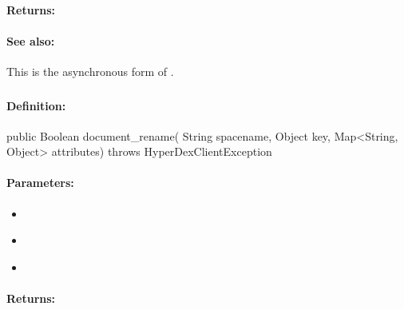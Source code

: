\paragraph{Returns:}


\paragraph{See also:}  This is the asynchronous form of .

\pagebreak
\subsubsection{}
\label{api:java:document_rename}


\paragraph{Definition:}
\begin{javacode}
public Boolean document_rename(
        String spacename,
        Object key,
        Map<String, Object> attributes) throws HyperDexClientException
\end{javacode}

\paragraph{Parameters:}
\begin{itemize}[noitemsep]
\item {}\\

\item {}\\

\item {}\\

\end{itemize}

\paragraph{Returns:}


